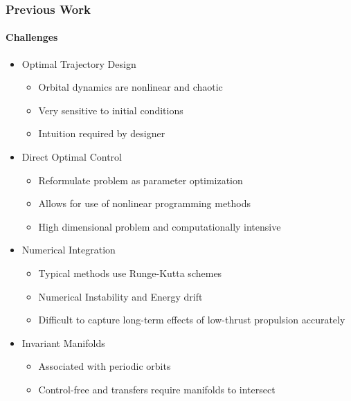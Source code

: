 \documentclass[11pt,professionalfonts]{beamer}
\begin{document}
\begin{frame} %
\frametitle{Previous Work} %
\framesubtitle{Challenges}
\begin{itemize}
	\item Optimal Trajectory Design
		\begin{itemize}
			\item Orbital dynamics are nonlinear and chaotic
			\item Very sensitive to initial conditions
			\item Intuition required by designer
		\end{itemize}
	\pause
	\item Direct Optimal Control
		\begin{itemize}
			\item Reformulate problem as parameter optimization
			\item Allows for use of nonlinear programming methods
			\item High dimensional problem and computationally intensive
		\end{itemize}
	\pause
	\item Numerical Integration
		\begin{itemize}
			\item Typical methods use Runge-Kutta schemes
			\item Numerical Instability and Energy drift
			\item Difficult to capture  long-term effects of low-thrust propulsion accurately
		\end{itemize}
	\pause
	\item Invariant Manifolds
		\begin{itemize}
			\item Associated with periodic orbits
			\item Control-free and transfers require manifolds to intersect
		\end{itemize}
\end{itemize}
\end{frame}   %
\end{document}
